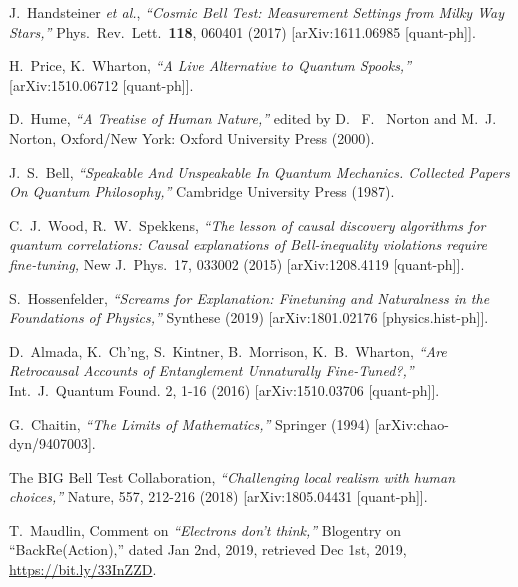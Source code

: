 \documentclass[12pt]{article}
\begin{document}
\begin{thebibliography}{99}
{%
  J.~Handsteiner {\it et al.},
  {\sl ``Cosmic Bell Test: Measurement Settings from Milky Way Stars,''}
  Phys.\ Rev.\ Lett.\  {\bf 118}, 060401 (2017)  
  [arXiv:1611.06985 [quant-ph]].
  
   H.~Price, K.~Wharton, {\sl ``A Live Alternative to Quantum Spooks,''} [arXiv:1510.06712 [quant-ph]].
  
  
D.~Hume, {\sl ``A Treatise of Human Nature,''} edited by D.~ F.~ Norton and M.~J.~ Norton, Oxford/New York: Oxford University Press (2000).
    
  J.~S.~Bell,
  {\sl ``Speakable And Unspeakable In Quantum Mechanics. Collected Papers On Quantum Philosophy,''}
  Cambridge University Press (1987).
  
 
  
C.~J.~Wood, R.~W.~Spekkens, {\sl ``The lesson of causal discovery algorithms for quantum correlations: Causal explanations of Bell-inequality violations require fine-tuning,} New J.\ Phys.\ 17, 033002 (2015) [arXiv:1208.4119 [quant-ph]].

  S.~Hossenfelder,
  {\sl ``Screams for Explanation: Finetuning and Naturalness in the Foundations of Physics,''} Synthese (2019)
[arXiv:1801.02176 [physics.hist-ph]].
  
D.~Almada, K.~Ch'ng, S.~Kintner, B.~Morrison, K.~B.~Wharton, {\sl ``Are Retrocausal Accounts of Entanglement Unnaturally Fine-Tuned?,''} 	Int.\ J.\ Quantum Found. 2, 1-16 (2016) [arXiv:1510.03706 [quant-ph]].


 G.~Chaitin, {\sl ``The Limits of Mathematics,''} Springer (1994) [arXiv:chao-dyn/9407003].

 The {\sc BIG} Bell Test Collaboration, {\sl ``Challenging local realism with human choices,''} Nature, 557, 212-216 (2018) [arXiv:1805.04431 [quant-ph]].

 T.~Maudlin, Comment on {\sl ``Electrons don't think,''} Blogentry on ``BackRe(Action),''  dated Jan 2nd, 2019, retrieved Dec 1st, 2019, {\url{https://bit.ly/33InZZD}}.

}
\end{thebibliography}
\end{document}
